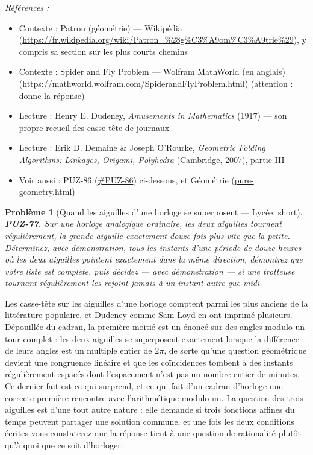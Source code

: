 \documentclass[11pt]{article}
\newtheorem{problem}{Problème}
\newenvironment{refs}{\par\small\noindent\emph{Références :}\begin{itemize}\setlength\itemsep{0pt}}{\end{itemize}\normalsize}
\begin{document}
\begin{refs}
\item Contexte : Patron (géométrie) --- Wikipédia (\url{https://fr.wikipedia.org/wiki/Patron_%28g%C3%A9om%C3%A9trie%29}), y compris sa section sur les plus courts chemins
\item Contexte : Spider and Fly Problem --- Wolfram MathWorld (en anglais) (\url{https://mathworld.wolfram.com/SpiderandFlyProblem.html}) (attention : donne la réponse)
\item Lecture : Henry E. Dudeney, \textit{Amusements in Mathematics} (1917) --- son propre recueil des casse-tête de journaux
\item Lecture : Erik D. Demaine \& Joseph O'Rourke, \textit{Geometric Folding Algorithms: Linkages, Origami, Polyhedra} (Cambridge, 2007), partie III
\item Voir aussi : PUZ-86 (\url{#PUZ-86}) ci-dessous, et Géométrie (\url{pure-geometry.html})
\end{refs}

\bigskip

\begin{problem}[{Quand les aiguilles d'une horloge se superposent --- Lycée, short}]
\textbf{PUZ-77.} Sur une horloge analogique ordinaire, les deux
aiguilles tournent régulièrement, la grande aiguille exactement douze fois plus vite que la
petite. Déterminez, avec démonstration, tous les instants d'une période de douze heures où
les deux aiguilles pointent exactement dans la même direction, démontrez que votre liste est
complète, puis décidez --- avec démonstration --- si une trotteuse tournant régulièrement les
rejoint jamais à un instant autre que midi.
\end{problem}

\noindent Les casse-tête sur les aiguilles d'une horloge comptent parmi les plus
anciens de la littérature populaire, et Dudeney comme Sam Loyd en ont imprimé plusieurs.
Dépouillée du cadran, la première moitié est un énoncé sur des angles modulo un tour complet :
les deux aiguilles se superposent exactement lorsque la différence de leurs angles est un
multiple entier de $ 2\pi $, de sorte qu'une question géométrique devient une congruence
linéaire et que les coïncidences tombent à des instants régulièrement espacés dont
l'espacement n'est pas un nombre entier de minutes. Ce dernier fait est ce qui surprend, et
ce qui fait d'un cadran d'horloge une correcte première rencontre avec l'arithmétique modulo
un. La question des trois aiguilles est d'une tout autre nature : elle demande si trois
fonctions affines du temps peuvent partager une solution commune, et une fois les deux
conditions écrites vous constaterez que la réponse tient à une question de rationalité
plutôt qu'à quoi que ce soit d'horloger.
\end{document}
